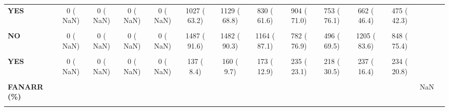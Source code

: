 \documentclass[
]{article}
\begin{document}
\begin{table}[H]
\begin{tabular}[t]{>{\raggedright\arraybackslash}p{5em}ccccccccccccc}
\textbf{YES} & 0 (  NaN) & 0 (  NaN) & 0 (  NaN) & 0 (  NaN) & 1027 ( 63.2) & 1129 ( 68.8) & 830 ( 61.6) & 904 ( 71.0) & 753 ( 76.1) & 662 ( 46.4) & 475 ( 42.3) &  & \\
\textbf{\cellcolor{gray!10}{FARBL (\%)}} & \cellcolor{gray!10}{} & \cellcolor{gray!10}{} & \cellcolor{gray!10}{} & \cellcolor{gray!10}{} & \cellcolor{gray!10}{} & \cellcolor{gray!10}{} & \cellcolor{gray!10}{} & \cellcolor{gray!10}{} & \cellcolor{gray!10}{} & \cellcolor{gray!10}{} & \cellcolor{gray!10}{} & \cellcolor{gray!10}{NaN} & \cellcolor{gray!10}{}\\
\textbf{NO} & 0 (  NaN) & 0 (  NaN) & 0 (  NaN) & 0 (  NaN) & 1487 ( 91.6) & 1482 ( 90.3) & 1164 ( 87.1) & 782 ( 76.9) & 496 ( 69.5) & 1205 ( 83.6) & 848 ( 75.4) &  & \\
\textbf{\cellcolor{gray!10}{Unknown}} & \cellcolor{gray!10}{0 (  NaN)} & \cellcolor{gray!10}{0 (  NaN)} & \cellcolor{gray!10}{0 (  NaN)} & \cellcolor{gray!10}{0 (  NaN)} & \cellcolor{gray!10}{0 (  0.0)} & \cellcolor{gray!10}{0 (  0.0)} & \cellcolor{gray!10}{0 (  0.0)} & \cellcolor{gray!10}{0 (  0.0)} & \cellcolor{gray!10}{0 (  0.0)} & \cellcolor{gray!10}{0 (  0.0)} & \cellcolor{gray!10}{42 (  3.7)} & \cellcolor{gray!10}{} & \cellcolor{gray!10}{}\\
\textbf{YES} & 0 (  NaN) & 0 (  NaN) & 0 (  NaN) & 0 (  NaN) & 137 (  8.4) & 160 (  9.7) & 173 ( 12.9) & 235 ( 23.1) & 218 ( 30.5) & 237 ( 16.4) & 234 ( 20.8) &  & \\
\textbf{\cellcolor{gray!10}{FBBLOCK = YES (\%)}} & \cellcolor{gray!10}{0 (  NaN)} & \cellcolor{gray!10}{0 (  NaN)} & \cellcolor{gray!10}{0 (  NaN)} & \cellcolor{gray!10}{0 (  NaN)} & \cellcolor{gray!10}{1312 ( 80.7)} & \cellcolor{gray!10}{1338 ( 81.5)} & \cellcolor{gray!10}{1037 ( 76.9)} & \cellcolor{gray!10}{1204 ( 87.6)} & \cellcolor{gray!10}{989 ( 88.6)} & \cellcolor{gray!10}{933 ( 66.2)} & \cellcolor{gray!10}{0 (  NaN)} & \cellcolor{gray!10}{NaN} & \cellcolor{gray!10}{}\\
\textbf{FANARR (\%)} &  &  &  &  &  &  &  &  &  &  &  & NaN & \\
\textbf{\cellcolor{gray!10}{NO}} & \cellcolor{gray!10}{0 (  NaN)} & \cellcolor{gray!10}{0 (  NaN)} & \cellcolor{gray!10}{0 (  NaN)} & \cellcolor{gray!10}{0 (  NaN)} & \cellcolor{gray!10}{0 (  NaN)} & \cellcolor{gray!10}{1574 ( 95.9)} & \cellcolor{gray!10}{1333 ( 99.6)} & \cellcolor{gray!10}{932 ( 99.4)} & \cellcolor{gray!10}{594 ( 98.7)} & \cellcolor{gray!10}{1466 ( 99.9)} & \cellcolor{gray!10}{1077 ( 95.8)} & \cellcolor{gray!10}{} & \cellcolor{gray!10}{}\\

\end{tabular}
\end{table}
\end{document}

